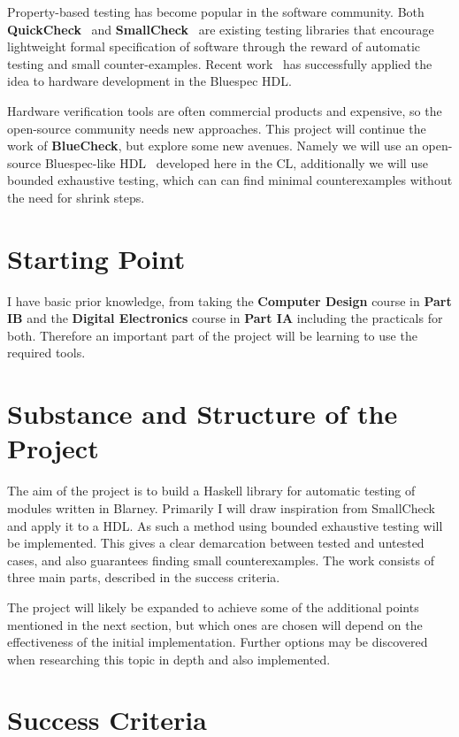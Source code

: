\documentclass[UKenglish, 12pt]{article}
\begin{document}
Property-based testing has become popular in the software community. Both \textbf{QuickCheck}~\cite{QuickCheck} and \textbf{SmallCheck}~\cite{SmallCheck} are existing testing libraries that encourage lightweight formal specification
of software through the reward of automatic testing and small counter-examples.
Recent work~\cite{BlueCheck} has successfully applied the idea to
hardware development in the Bluespec HDL.

Hardware verification tools are often commercial products and
expensive, so the open-source community needs new approaches.
This project will continue the work of \textbf{BlueCheck}, but explore some
new avenues. Namely we will use an open-source Bluespec-like HDL~\cite{Blarney}
developed here in the CL, additionally we will use bounded exhaustive testing,
which can can find minimal counterexamples without the need for shrink steps.


\section*{Starting Point}

I have basic prior knowledge, from taking the \textbf{Computer Design} course in \textbf{Part IB} and the \textbf{Digital Electronics} course in \textbf{Part IA} including the practicals for both. Therefore an important part of the project will be learning to use the required tools.


\section*{Substance and Structure of the Project}

The aim of the project is to build a Haskell library for automatic testing
of modules written in Blarney. Primarily I will draw inspiration from SmallCheck~\cite{SmallCheck}
and apply it to a HDL. As such a method using bounded exhaustive testing will
be implemented. This gives a clear demarcation between tested
and untested cases, and also guarantees finding small counterexamples. The work consists
of three main parts, described in the success criteria.

The project will likely be expanded to achieve some of the additional points mentioned
in the next section, but which ones are chosen will depend on the effectiveness of
the initial implementation. Further options may be discovered when
researching this topic in depth and also implemented.


\section*{Success Criteria}
\end{document}
